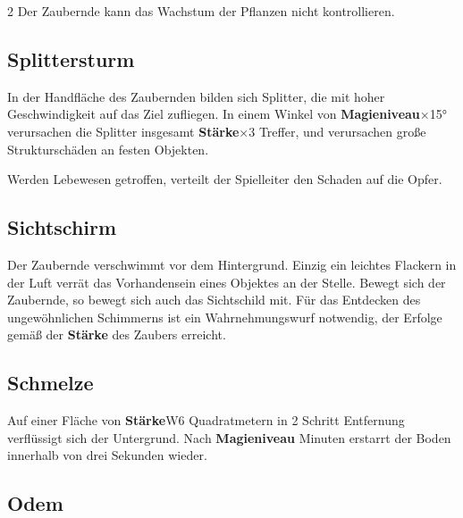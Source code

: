 \begin{multicols*}{2}
Der Zaubernde kann das Wachstum der Pflanzen nicht kontrollieren.



\subsection{Splittersturm}

In der Handfläche des Zaubernden bilden sich Splitter, die mit hoher Geschwindigkeit auf das Ziel zufliegen. In einem Winkel von \textbf{Magieniveau}×15° verursachen die Splitter insgesamt \textbf{Stärke}×3 Treffer, und verursachen große Strukturschäden an festen Objekten.

Werden Lebewesen getroffen, verteilt der Spielleiter den Schaden auf die Opfer.



\subsection{Sichtschirm}

Der Zaubernde verschwimmt vor dem Hintergrund. Einzig ein leichtes Flackern in der Luft verrät das Vorhandensein eines Objektes an der Stelle. Bewegt sich der Zaubernde, so bewegt sich auch das Sichtschild mit. Für das Entdecken des ungewöhnlichen Schimmerns ist ein Wahrnehmungswurf notwendig, der Erfolge gemäß der \textbf{Stärke} des Zaubers erreicht.



\subsection{Schmelze}

Auf einer Fläche von \textbf{Stärke}W6 Quadratmetern in 2 Schritt Entfernung verflüssigt sich der Untergrund. Nach \textbf{Magieniveau} Minuten erstarrt der Boden  innerhalb von drei Sekunden wieder.



\subsection{Odem}


\end{multicols*}
